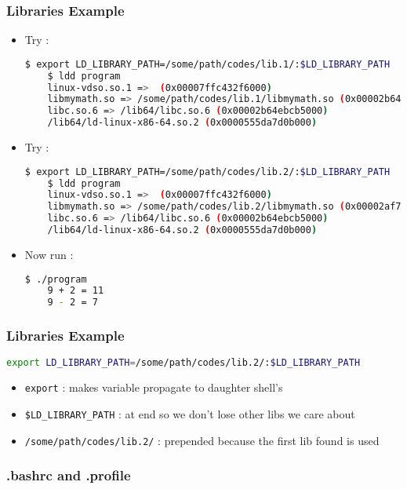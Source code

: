 \documentclass{beamer}
\newcommand{\code}[1]{\colorbox{codegray}{\texttt{#1}}}
\begin{document}
\begin{frame}[fragile]
\frametitle{Libraries Example}
\begin{itemize}
    \item Try : 
    \begingroup
    \tiny
    \begin{lstlisting}[backgroundcolor = \color{codegray}, language = Bash, showstringspaces=false]
    $ export LD_LIBRARY_PATH=/some/path/codes/lib.1/:$LD_LIBRARY_PATH
    $ ldd program
	linux-vdso.so.1 =>  (0x00007ffc432f6000)
	libmymath.so => /some/path/codes/lib.1/libmymath.so (0x00002b64eba91000)
	libc.so.6 => /lib64/libc.so.6 (0x00002b64ebcb5000)
	/lib64/ld-linux-x86-64.so.2 (0x0000555da7d0b000)
    \end{lstlisting}
    \endgroup

    \pause
    \item Try : 
    \begingroup
    \tiny
    \begin{lstlisting}[backgroundcolor = \color{codegray}, language = Bash, showstringspaces=false]
    $ export LD_LIBRARY_PATH=/some/path/codes/lib.2/:$LD_LIBRARY_PATH
    $ ldd program
	linux-vdso.so.1 =>  (0x00007ffc432f6000)
	libmymath.so => /some/path/codes/lib.2/libmymath.so (0x00002af711fe1000)
	libc.so.6 => /lib64/libc.so.6 (0x00002b64ebcb5000)
	/lib64/ld-linux-x86-64.so.2 (0x0000555da7d0b000)
    \end{lstlisting}
    \endgroup

    \pause
    \item Now run : 
    \begingroup
    \tiny
    \begin{lstlisting}[backgroundcolor = \color{codegray}, language = Bash, showstringspaces=false]
    $ ./program
    9 + 2 = 11
    9 - 2 = 7
    \end{lstlisting}
    \endgroup
\end{itemize}
\end{frame}


\begin{frame}[fragile]
\frametitle{Libraries Example}
    \begingroup
    \scriptsize
    \begin{lstlisting}[backgroundcolor = \color{codegray}, language = Bash, showstringspaces=false]
    export LD_LIBRARY_PATH=/some/path/codes/lib.2/:$LD_LIBRARY_PATH
    \end{lstlisting}
    \endgroup

    \begin{itemize}
        \item \code{\scriptsize export} : makes variable propagate to daughter shell's
        \pause
        \bigskip
        \item \code{\scriptsize \$LD\_LIBRARY\_PATH} : at end so we don't lose other libs we care about
        \pause
        \bigskip
        \item \code{\scriptsize /some/path/codes/lib.2/} : prepended because the first lib found is used
    \end{itemize}
\end{frame}



\begin{frame}
\frametitle{.bashrc and .profile}
\begin{itemize}


\end{itemize}
\end{frame}
\end{document}
